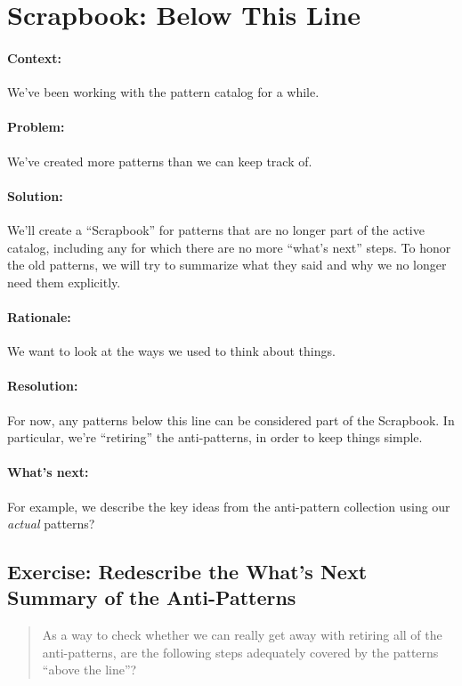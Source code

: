 \section{Scrapbook: Below This Line}

\paragraph{Context:} We've been working with the pattern catalog for a while.
\paragraph{Problem:} We've created more patterns than we can keep track of.
\paragraph{Solution:} We'll create a ``Scrapbook'' for patterns that are no longer part of the active catalog, including any for which there are no more ``what's next'' steps.   To honor the old patterns, we will try to summarize what they said and why we no longer need them explicitly.
\paragraph{Rationale:} We want to look at the ways we used to think about things.
\paragraph{Resolution:} For now, any patterns below this line can be considered part of the Scrapbook.  In particular, we're ``retiring'' the anti-patterns, in order to keep things simple.
\paragraph{What's next:} For example, we describe the key ideas from the anti-pattern collection using our \emph{actual} patterns?

\subsection{Exercise: Redescribe the What's Next Summary of the Anti-Patterns}

\begin{quote}
As a way to check whether we can really get away with retiring all of the anti-patterns, are the following steps adequately covered by the patterns ``above the line''?
\end{quote}

